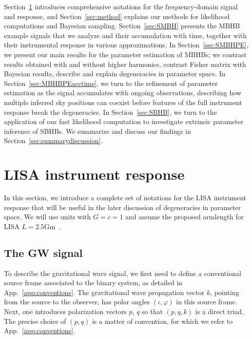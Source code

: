 \documentclass[aps,showpacs,twocolumn,prd,superscriptaddress,nofootinbib]{revtex4-1}
\begin{document}
Section~\ref{sec:response} introduces comprehensive notations for the frequency-domain signal and response, and Section~\ref{sec:method} explains our methods for likelihood computations and Bayesian sampling. Section~\ref{sec:SMBH} presents the MBHB example signals that we analyze and their accumulation with time, together with their instrumental response in various approximations. In Section~\ref{sec:SMBHPE}, we present our main results for the parameter estimation of MBHBs; we contrast results obtained with and without higher harmonics, contrast Fisher matrix with Bayesian results, describe and explain degeneracies in parameter space. In Section~\ref{sec:MBHBPEacctime}, we turn to the refinement of parameter estimation as the signal accumulates with ongoing observations, describing how multiple inferred sky positions can coexist before features of the full instrument response break the degeneracies. In Section~\ref{sec:SBHB}, we turn to the application of our fast likelihood computation to investigate extrinsic parameter inference of SBHBs. We summarize and discuss our findings in Section~\ref{sec:summarydiscussion}.


\section{LISA instrument response}
\label{sec:response}

In this section, we introduce a complete set of notations for the LISA instrument response that will be useful in the later discussion of degeneracies in parameter space. We will use units with $G=c=1$ and assume the proposed armlength for LISA $L = 2.5\mathrm{Gm}$~\cite{LISA2017}.


\subsection{The GW signal}
\label{sec:gwsignal}

To describe the gravitational wave signal, we first need to define a conventional source frame associated to the binary system, as detailed in App.~\ref{app:conventions}. The gravitational wave propagation vector $k$, pointing from the source to the observer, has polar angles $(\iota, \varphi)$ in this source frame. Next, one introduces polarization vectors $p$, $q$ so that $(p, q, k)$ is a direct triad. The precise choice of $(p,q)$ is a matter of convention, for which we refer to App.~\ref{app:conventions}.
\end{document}
